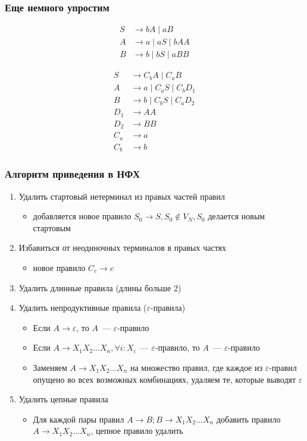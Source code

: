 \documentclass{beamer}
\begin{document}
\begin{frame}[fragile]
  \transwipe[direction=90]
  \frametitle{Еще немного упростим}      
  
\begin{align*}
  S &\to bA \mid aB \\
  A &\to a  \mid aS \mid bAA  \\
  B &\to b  \mid bS \mid aBB 
\end{align*}

\vfill 

\begin{align*}
  S   &\to C_b A \mid C_a B \\
  A   &\to a \mid C_a S \mid C_b D_1 \\
  B   &\to b \mid C_b S \mid C_a D_2 \\
  D_1 &\to A A \\
  D_2 &\to B B \\
  C_a &\to a \\
  C_b &\to b 
\end{align*}
\end{frame}

\begin{frame}[fragile]
  \transwipe[direction=90]
  \frametitle{Алгоритм приведения в НФХ}      
  
  \begin{enumerate}
    \item Удалить стартовый нетерминал из правых частей правил 
    \begin{itemize}
      \item добавляется новое правило $S_0 \to S, S_0 \notin V_N, S_0$ делается новым стартовым
    \end{itemize}
    \item Избавиться от неодиночных терминалов в правых частях 
    \begin{itemize} 
      \item новое правило $C_c \to c$
    \end{itemize}
    \item Удалить длинные правила (длины больше 2)
    \item Удалить непродуктивные правила ($\varepsilon$-правила)
    \begin{itemize}
      \item Если $A \to \varepsilon$, то $A$~--- $\varepsilon$-правило
      \item Если $A \to X_1 X_2 \dots X_n, \forall i: X_i$~--- $\varepsilon$-правило, то $A$~--- $\varepsilon$-правило
      \item Заменяем $A \to X_1 X_2 \dots X_n$ на множество правил, где каждое из $\varepsilon$-правил опущено во всех возможных комбинациях, удаляем те, которые выводят $\varepsilon$
    \end{itemize}
    \item Удалить цепные правила
    \begin{itemize}
      \item Для каждой пары правил $A \to B; B \to  X_1 X_2 \dots X_n$ добавить правило $A \to  X_1 X_2 \dots X_n$, цепное правило удалить
    \end{itemize}
  \end{enumerate}
\end{frame}
\end{document}
